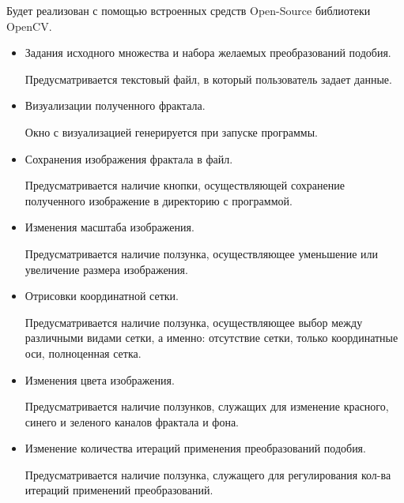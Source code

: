 \documentclass[a4paper,12pt,preview]{report} %
\begin{document}
		Будет реализован с помощью встроенных средств Open-Source библиотеки OpenCV.
		
		
		\begin{itemize}
			\item Задания исходного множества и набора желаемых преобразований подобия.
			
			Предусматривается текстовый файл, в который пользователь задает данные. \\
			
			\item Визуализации полученного фрактала.
			
			Окно с визуализацией генерируется при запуске программы. \\
			
			\item Сохранения изображения фрактала в файл.
			
			Предусматривается наличие кнопки, осуществляющей сохранение полученного изображение в директорию с программой. \\
			
			\item Изменения масштаба изображения.
			
			Предусматривается наличие ползунка, осуществляющее уменьшение или увеличение размера изображения. \\
			
			\item Отрисовки координатной сетки.
			
			Предусматривается наличие ползунка, осуществляющее выбор между различными видами сетки, а именно: отсутствие сетки, только координатные оси, полноценная сетка. \\
			
			\item Изменения цвета изображения.
			
			Предусматривается наличие ползунков, служащих для изменение красного, синего и зеленого каналов фрактала и фона. \\
			
			\item Изменение количества итераций применения преобразований подобия.
			
			Предусматривается наличие ползунка, служащего для регулирования кол-ва итераций применений преобразований.
			
			
		\end{itemize}
		
		
	
	

	
\end{document}
